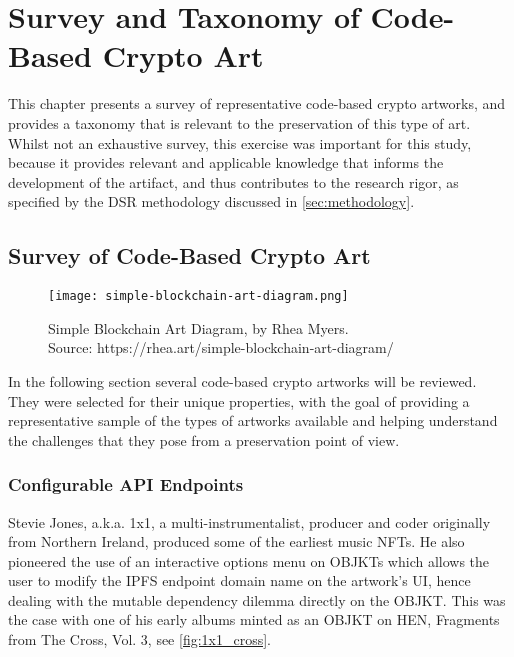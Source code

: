 \chapter{Survey and Taxonomy of Code-Based Crypto Art}
\label{chap:survey}

This chapter presents a survey of representative code-based crypto artworks, and provides a taxonomy that is relevant to the preservation of this type of art. Whilst not an exhaustive survey, this exercise was important for this study, because it provides relevant and applicable knowledge that informs the development of the artifact, and thus contributes to the research rigor, as specified by the DSR methodology discussed in \autoref{sec:methodology}.


\section{Survey of Code-Based Crypto Art}
\label{sec:survey-crypto-art}

\begin{figure}[h]
    \centering
    \captionsetup{justification=centering}
    \texttt{[image: simple-blockchain-art-diagram.png]}
    \captionsetup{justification=centering}
    \caption[Simple Blockchain Art Diagram, by Rhea Myers]{Simple Blockchain Art Diagram, by Rhea Myers. \\ Source: https://rhea.art/simple-blockchain-art-diagram/}
    \label{fig:vdp}
\end{figure}



In the following section several code-based crypto artworks will be reviewed. They were selected for their unique properties, with the goal of providing a representative sample of the types of artworks available and helping understand the challenges that they pose from a preservation point of view.

\subsection{Configurable API Endpoints}

Stevie Jones, a.k.a. 1x1\footnotemark[1], a multi-instrumentalist, producer and coder originally from Northern Ireland, produced some of the earliest music NFTs. He also pioneered the use of an interactive options menu on OBJKTs which allows the user to modify the IPFS endpoint domain name on the artwork's UI, hence dealing with the mutable dependency dilemma directly on the OBJKT. This was the case with one of his early albums minted as an OBJKT on HEN, Fragments from The Cross, Vol. 3, see \autoref{fig:1x1_cross}.

